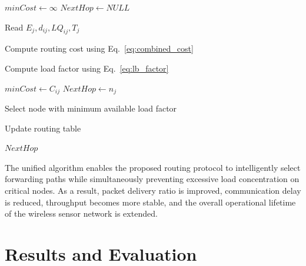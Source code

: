 \documentclass[a4paper,fleqn]{cas-dc}
\numberwithin{equation}{section}
\begin{document}
\begin{algorithm}[H]
\caption{Algorithm 3: AdaptiveNextHopLoadBalancedSelection()}
\label{alg:combined}
\begin{algorithmic}[1]

\STATE $minCost \leftarrow \infty$
\STATE $NextHop \leftarrow NULL$



        \STATE Read $E_j,d_{ij},LQ_{ij},T_j$

        \STATE Compute routing cost using Eq.~\ref{eq:combined_cost}

        \STATE Compute load factor using Eq.~\ref{eq:lb_factor}



                \STATE $minCost \leftarrow C_{ij}$
                \STATE $NextHop \leftarrow n_j$

            \ENDIF

        \ENDIF

    \ENDIF

\ENDFOR


    \STATE Select node with minimum available load factor

\ENDIF

\STATE Update routing table

\RETURN $NextHop$

\end{algorithmic}
\end{algorithm}

The unified algorithm enables the proposed routing protocol to intelligently select forwarding paths while simultaneously preventing excessive load concentration on critical nodes. As a result, packet delivery ratio is improved, communication delay is reduced, throughput becomes more stable, and the overall operational lifetime of the wireless sensor network is extended.

\section{Results and Evaluation}
\end{document}
